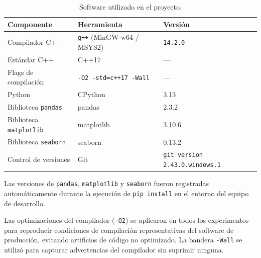 \begin{table}[t]
  \centering
  \caption{Software utilizado en el proyecto.}
  \label{tab:software}
  \begin{tabular}{lll}
    \toprule
    \textbf{Componente} & \textbf{Herramienta} & \textbf{Versión} \\
    \midrule
    Compilador C++ & \texttt{g++} (MinGW-w64 / MSYS2) &
      \texttt{14.2.0} \\
    Estándar C++   & C++17 & — \\
    Flags de compilación & \texttt{-O2 -std=c++17 -Wall} & — \\
    Python         & CPython & 3.13\footnotemark \\
    Biblioteca \texttt{pandas}   & pandas  & 2.3.2 \\
    Biblioteca \texttt{matplotlib} & matplotlib & 3.10.6 \\
    Biblioteca \texttt{seaborn}  & seaborn & 0.13.2 \\
    Control de versiones & Git & \texttt{git version 2.43.0.windows.1} \\
    \bottomrule
  \end{tabular}
\end{table}


Las versiones de \texttt{pandas}, \texttt{matplotlib} y \texttt{seaborn}
fueron registradas automáticamente durante la ejecución de
\texttt{pip install} en el entorno del equipo de desarrollo.

Las optimizaciones del compilador (\texttt{-O2}) se aplicaron en todos los
experimentos para reproducir condiciones de compilación representativas del
software de producción, evitando artificios de código no optimizado.
La bandera \texttt{-Wall} se utilizó para capturar advertencias del
compilador sin suprimir ninguna.
